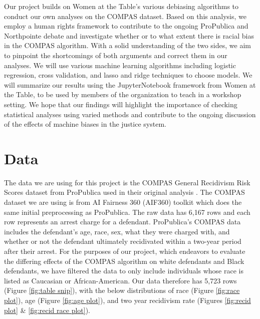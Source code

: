 \documentclass[water,article,submit,moreauthors,pdftex]{mdpi}
\begin{document}
Our project builds on Women at the Table's various debiasing algorithms
to conduct our own analyses on the COMPAS dataset. Based on this
analysis, we employ a human rights framework to contribute to the
ongoing ProPublica and Northpointe debate and investigate whether or to
what extent there is racial bias in the COMPAS algorithm. With a solid
understanding of the two sides, we aim to pinpoint the shortcomings of
both arguments and correct them in our analyses. We will use various
machine learning algorithms including logistic regression, cross
validation, and lasso and ridge techniques to choose models. We will
summarize our results using the JupyterNotebook framework from Women at
the Table, to be used by members of the organization to teach in a
workshop setting. We hope that our findings will highlight the
importance of checking statistical analyses using varied methods and
contribute to the ongoing discussion of the effects of machine biases in
the justice system.

\hypertarget{data}{%
\section{Data}\label{data}}

The data we are using for this project is the COMPAS General Recidivism
Risk Scores dataset from ProPublica used in their original analysis
\citep{larson_propublicacompas-analysiscompas-scores-two-yearscsv_2022}.
The COMPAS dataset we are using is from AI Fairness 360 (AIF360) toolkit
\citep{noauthor_trusted-ai_360} which does the same initial
preprocessing as ProPublica. The raw data has 6,167 rows and each row
represents an arrest charge for a defendant. ProPublica's COMPAS data
includes the defendant's age, race, sex, what they were charged with,
and whether or not the defendant ultimately recidivated within a
two-year period after their arrest. For the purposes of our project,
which endeavors to evaluate the differing effects of the COMPAS
algorithm on white defendants and Black defendants, we have filtered the
data to only include individuals whose race is listed as Caucasian or
African-American. Our data therefore has 5,723 rows (Figure
\ref{fig:table snip}), with the below distributions of race (Figure
\ref{fig:race plot}), age (Figure \ref{fig:age plot}), and two year
recidivism rate (Figures \ref{fig:recid plot} \&
\ref{fig:recid race plot}).
\end{document}
